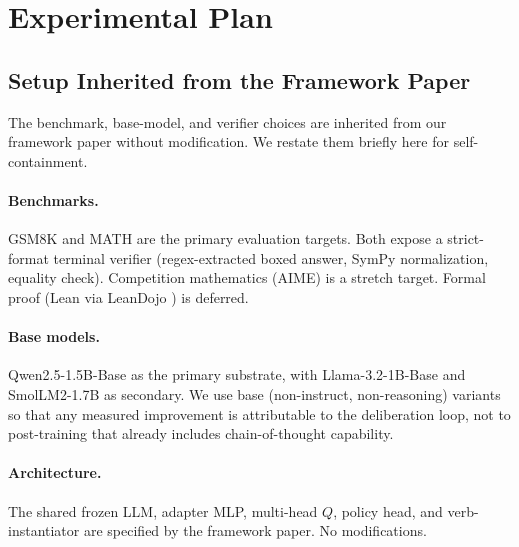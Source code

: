 \section{Experimental Plan}
\label{sec:experimental-plan}


\subsection{Setup Inherited from the Framework Paper}
\label{sec:exp-inherited}

The benchmark, base-model, and verifier choices are inherited from our
framework paper without modification. We restate them briefly here for
self-containment.

\paragraph{Benchmarks.}
GSM8K \citep{cobbe2021gsm8k} and MATH \citep{hendrycks2021math} are the
primary evaluation targets. Both expose a strict-format terminal
verifier (regex-extracted boxed answer, SymPy normalization, equality
check). Competition mathematics (AIME) is a stretch target. Formal
proof (Lean via LeanDojo \citep{yang2023leandojo}) is deferred.

\paragraph{Base models.}
Qwen2.5-1.5B-Base \citep{yang2024qwen25} as the primary substrate, with
Llama-3.2-1B-Base \citep{dubey2024llama3} and SmolLM2-1.7B
\citep{allal2024smollm2} as secondary. We use base (non-instruct,
non-reasoning) variants so that any measured improvement is attributable
to the deliberation loop, not to post-training that already includes
chain-of-thought capability.

\paragraph{Architecture.}
The shared frozen LLM, adapter MLP, multi-head $Q$, policy head, and
verb-instantiator are specified by the framework paper. No
modifications.

